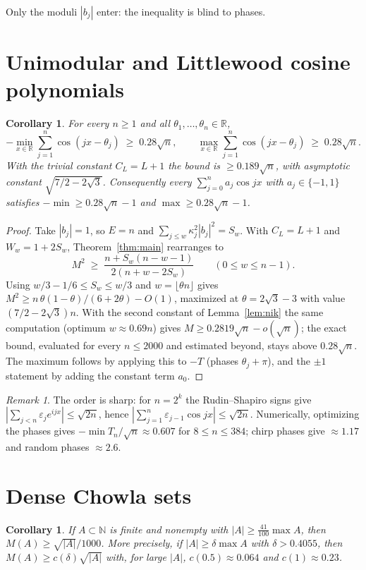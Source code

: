 \documentclass[11pt]{amsart}
\newtheorem{corollary}[theorem]{Corollary}
\theoremstyle{remark}
\newtheorem{remark}[theorem]{Remark}
\newcommand{\R}{\mathbb{R}}
\newcommand{\N}{\mathbb{N}}
\begin{document}
Only the moduli $|b_j|$ enter: the inequality is blind to phases.

\section{Unimodular and Littlewood cosine polynomials}

\begin{corollary}\label{cor:littlewood}
For every $n\ge1$ and all $\theta_1,\dots,\theta_n\in\R$,
\[
-\min_{x\in\R}\sum_{j=1}^n\cos(jx-\theta_j)\;\ge\;0.28\sqrt n,\qquad
\max_{x\in\R}\sum_{j=1}^n\cos(jx-\theta_j)\;\ge\;0.28\sqrt n .
\]
With the trivial constant $C_L=L+1$ the bound is $\ge0.189\sqrt n$, with asymptotic constant $\sqrt{7/2-2\sqrt3}$.
Consequently every $\sum_{j=0}^n a_j\cos jx$ with $a_j\in\{-1,1\}$ satisfies $-\min\ge0.28\sqrt n-1$ and
$\max\ge0.28\sqrt n-1$.
\end{corollary}

\begin{proof}
Take $|b_j|=1$, so $E=n$ and $\sum_{j\le w}\kappa_j^2|b_j|^2=S_w$. With $C_L=L+1$ and $W_w=1+2S_w$,
Theorem~\ref{thm:main} rearranges to
\[
M^2\;\ge\;\frac{n+S_w(n-w-1)}{2(n+w-2S_w)}\qquad(0\le w\le n-1).
\]
Using $w/3-1/6\le S_w\le w/3$ and $w=\lfloor\theta n\rfloor$ gives $M^2\ge n\,\theta(1-\theta)/(6+2\theta)-O(1)$,
maximized at $\theta=2\sqrt3-3$ with value $(7/2-2\sqrt3)n$. With the second constant of Lemma~\ref{lem:nik} the same
computation (optimum $w\approx0.69n$) gives $M\ge0.2819\sqrt n-o(\sqrt n)$; the exact bound, evaluated for every
$n\le2000$ and estimated beyond, stays above $0.28\sqrt n$. The maximum follows by applying this to $-T$ (phases
$\theta_j+\pi$), and the $\pm1$ statement by adding the constant term $a_0$.
\end{proof}

\begin{remark}
The order is sharp: for $n=2^k$ the Rudin--Shapiro signs give $|\sum_{j<n}\varepsilon_je^{ijx}|\le\sqrt{2n}$, hence
$|\sum_{j=1}^n\varepsilon_{j-1}\cos jx|\le\sqrt{2n}$. Numerically, optimizing the phases gives
$-\min T_n/\sqrt n\approx0.607$ for $8\le n\le384$; chirp phases give $\approx1.17$ and random phases $\approx2.6$.
\end{remark}

\section{Dense Chowla sets}

\begin{corollary}\label{cor:dense}
If $A\subset\N$ is finite and nonempty with $|A|\ge\frac{41}{100}\max A$, then $M(A)\ge\sqrt{|A|}/1000$. More precisely,
if $|A|\ge\delta\max A$ with $\delta>0.4055$, then $M(A)\ge c(\delta)\sqrt{|A|}$ with, for large $|A|$,
$c(0.5)\approx0.064$ and $c(1)\approx0.23$.
\end{corollary}
\end{document}
